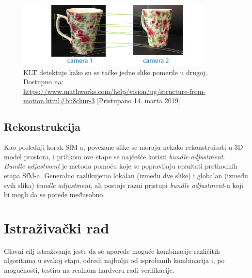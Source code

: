 \documentclass{article}
\begin{document}
        \begin{figure}[H]
            \centering
            \includegraphics[scale=0.8]{KLT.png}
            \caption{KLT detektuje kako su se tačke jedne slike pomerile u drugoj. Dostupno na: \url{https://www.mathworks.com/help/vision/ug/structure-from-motion.html\#bu8chur-3} [Pristupano 14. marta 2019].}
            \label{KLT}
        \end{figure}

    \subsection{Rekonstrukcija}
        Kao poslednji korak SfM-a, povezane slike se moraju nekako rekonstruisati u 3D model prostora, i prilikom ove etape se najčešće koristi \textit{bundle adjustment}. \textit{Bundle adjustment} je metoda pomoću koje se popravljaju rezultati prethodnih etapa SfM-a. Generalno razlikujemo lokalan (između dve slike) i globalan (između svih slika) \textit{bundle adjustment}, ali postoje razni pristupi \textit{bundle adjustment}-u koji bi mogli da se porede međusobno.



\section{Istraživački rad}
    Glavni cilj istraživanja jeste da se uporede moguće kombinacije različitih algoritama u svakoj etapi, odredi najbolja od isprobanih kombinacija i, po mogućnosti, testira na realnom hardveru radi verifikacije.
\end{document}

